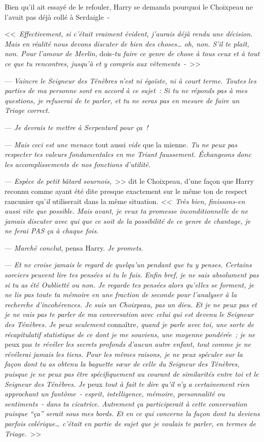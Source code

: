 Bien qu'il ait essayé de le refouler, Harry se demanda pourquoi le Choixpeau ne l'avait pas déjà collé à Serdaigle~-

<<~\emph{Effectivement, si c'était vraiment évident, j'aurais déjà rendu une décision. Mais en réalité nous devons discuter de bien des choses… oh, non. S'il te plaît, non. Pour l'amour de Merlin,} dois\emph{-tu faire ce genre de chose à tous ceux et à tout ce que tu rencontres, jusqu'à et y compris aux vêtements~-}~>>

--- \emph{Vaincre le Seigneur des Ténèbres n'est ni égoïste, ni à court terme. Toutes les parties de ma personne sont en accord à ce sujet~: Si tu ne réponds pas à mes questions, je refuserai de te parler, et tu ne seras pas en mesure de faire un Triage correct.}

--- \emph{Je devrais te mettre à Serpentard pour ça~!}

--- \emph{Mais ceci est une menace} tout aussi \emph{vide} que la mienne\emph{. Tu ne peux pas respecter tes valeurs fondamentales en me Triant faussement. Échangeons donc les accomplissements de nos fonctions d'utilité.}

--- \emph{Espèce de petit bâtard sournois,}~>> dit le Choixpeau, d'une façon que Harry reconnu comme ayant été dite presque exactement sur le même ton de respect rancunier qu'\emph{il} utiliserait dans la même situation. \emph{<<~Très bien, finissons-en aussi vite que possible. Mais avant, je veux ta promesse inconditionnelle de ne jamais discuter avec qui que ce soit de la possibilité de ce genre de chantage, je ne ferai PAS ça à chaque fois.}

--- \emph{Marché conclut}, pensa Harry. \emph{Je promets}.

--- \emph{Et ne croise jamais le regard de quelqu'un pendant que tu y penses. Certains sorciers peuvent lire tes pensées si tu le fais. Enfin bref, je ne sais absolument pas si tu as été Oublietté ou non. Je regarde tes pensées alors qu'elles se forment, je ne lis pas toute ta mémoire en une fraction de seconde pour l'analyser à la recherche d'incohérences. Je suis un Choixpeau, pas un dieu. Et je ne peux pas et je ne vais pas te parler de ma conversation avec celui qui est devenu le Seigneur des Ténèbres. Je peux seulement} connaître\emph{, quand je parle avec toi, une sorte de récapitulatif statistique de ce dont je me souviens, une moyenne pondérée~; je ne} peux pas \emph{te révéler les secrets profonds d'aucun autre enfant, tout comme je ne révélerai jamais les tiens. Pour les mêmes raisons, je ne peux spéculer sur la façon dont tu as obtenu la baguette sœur de celle du Seigneur des Ténèbres, puisque je ne peux pas être spécifiquement au courant de similarités entre toi et le Seigneur des Ténèbres. Je} peux \emph{tout à fait te dire qu'il n'y a certainement rien approchant un fantôme~- esprit, intelligence, mémoire, personnalité ou sentiments~- dans ta cicatrice. Autrement ça participerait à cette conversation puisque “ça” serait sous mes bords. Et en ce qui concerne la façon dont tu deviens parfois colérique… c'était en partie de sujet que je voulais te parler, en termes de Triage.}~>>

